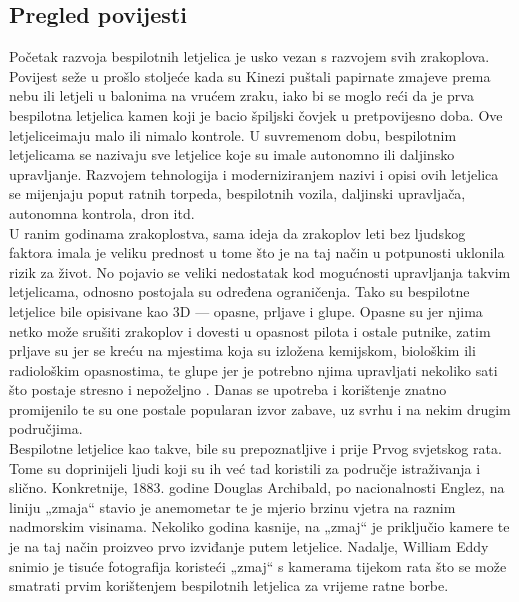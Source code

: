 \documentclass[times, utf8, diplomski]{fer}
\begin{document}
\subsection{Pregled povijesti}
Početak razvoja bespilotnih letjelica je usko vezan s razvojem svih zrakoplova. Povijest seže u prošlo stoljeće kada su Kinezi puštali papirnate zmajeve prema nebu ili letjeli u balonima na vrućem zraku, iako bi se moglo reći da je prva bespilotna letjelica kamen koji je bacio špiljski čovjek u pretpovijesno doba. Ove \glqq letjelice\grqq imaju malo ili nimalo kontrole. U suvremenom dobu, bespilotnim letjelicama se nazivaju sve letjelice koje su imale autonomno ili daljinsko upravljanje. Razvojem tehnologija i moderniziranjem nazivi i opisi ovih letjelica se mijenjaju poput ratnih torpeda, bespilotnih vozila, daljinski upravljača, autonomna kontrola, dron itd.\\
U ranim godinama zrakoplostva, sama ideja da zrakoplov leti bez ljudskog faktora imala je veliku prednost u tome što je na taj način u potpunosti uklonila rizik za život. No pojavio se veliki nedostatak kod mogućnosti upravljanja takvim letjelicama, odnosno postojala su određena ograničenja. Tako su bespilotne letjelice bile opisivane kao 3D  --- opasne, prljave i glupe. Opasne su jer njima netko može srušiti zrakoplov i dovesti u opasnost pilota i ostale putnike, zatim prljave su jer se kreću na mjestima koja su izložena kemijskom, biološkim ili radiološkim opasnostima, te glupe jer je potrebno njima upravljati nekoliko sati što postaje stresno i nepoželjno \citep{unmannedAircraftSystem}. Danas se upotreba i korištenje znatno promijenilo te su one postale popularan izvor zabave, uz svrhu i na nekim drugim područjima.\\
Bespilotne letjelice kao takve, bile su prepoznatljive i prije Prvog svjetskog rata. Tome su  doprinijeli ljudi koji su ih već tad koristili za područje istraživanja i slično. Konkretnije, 1883.  godine  Douglas  Archibald, po  nacionalnosti Englez,  na liniju  „zmaja“  stavio  je anemometar  te  je  mjerio  brzinu  vjetra  na  raznim  nadmorskim  visinama. Nekoliko  godina kasnije, na „zmaj“ je priključio kamere te je na taj način proizveo prvo izviđanje putem letjelice. Nadalje, William Eddy snimio je tisuće fotografija koristeći „zmaj“ s kamerama tijekom rata što se može smatrati prvim korištenjem bespilotnih letjelica za vrijeme ratne borbe\citep{UAVSystems}.\\
\end{document}
